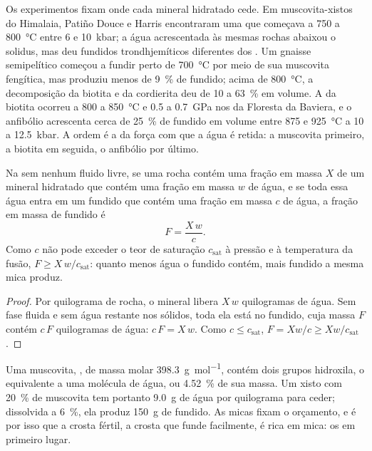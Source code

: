 Os experimentos fixam onde cada mineral hidratado cede. Em muscovita-xistos do
Himalaia, Patiño Douce e Harris encontraram uma  que começava a 750 a
\qty{800}{\celsius} entre 6 e \qty{10}{kbar}; a água acrescentada às mesmas rochas abaixou o
solidus, mas deu fundidos trondhjemíticos diferentes dos . Um gnaisse semipelítico
começou a fundir perto de \qty{700}{\celsius} por meio de sua muscovita fengítica, mas produziu menos
de \qty{9}{\percent} de fundido; acima de \qty{800}{\celsius}, a decomposição da biotita e da
cordierita deu de 10 a \qty{63}{\percent} em volume. A  da biotita ocorreu
a 800 a \qty{850}{\celsius} e 0.5 a \qty{0.7}{GPa} nos  da
Floresta da Baviera, e o anfibólio acrescenta cerca de \qty{25}{\percent} de fundido em volume entre 875
e \qty{925}{\celsius} a 10 a \qty{12.5}{kbar}. A ordem é a da força com que a água é retida:
a muscovita primeiro, a biotita em seguida, o anfibólio por último.

\begin{proposition}\label{prop:b2:crustal-melting:water}
Na  sem nenhum fluido livre, se uma rocha contém uma fração em massa $X$ de um
mineral hidratado que contém uma fração em massa $w$ de água, e se toda essa água entra em um
fundido que contém uma fração em massa $c$ de água, a fração em massa de fundido é
\[F = \frac{X\,w}{c}.\]
Como $c$ não pode exceder o teor de saturação $c_{\mathrm{sat}}$ à pressão e à
temperatura da fusão, $F \ge X\,w/c_{\mathrm{sat}}$: quanto menos água o fundido contém,
mais fundido a mesma mica produz.
\end{proposition}

\begin{proof}
Por quilograma de rocha, o mineral libera $X\,w$ quilogramas de água. Sem fase fluida
e sem água restante nos sólidos, toda ela está no fundido, cuja massa $F$ contém $c\,F$
quilogramas de água: $c\,F = X\,w$. Como $c \le c_{\mathrm{sat}}$, $F = Xw/c \ge
Xw/c_{\mathrm{sat}}$.
\end{proof}

Uma muscovita, , de massa molar \qty{398.3}{\gram\per\mole}, contém dois
grupos hidroxila, o equivalente a uma molécula de água, ou \qty{4.52}{\percent} de sua
massa. Um xisto com \qty{20}{\percent} de muscovita tem portanto \qty{9.0}{\gram} de água
por quilograma para ceder; dissolvida a \qty{6}{\percent}, ela produz \qty{150}{\gram} de
fundido. As micas fixam o orçamento, e é por isso que a crosta fértil, a crosta que funde facilmente,
é rica em mica: os  em primeiro lugar.

